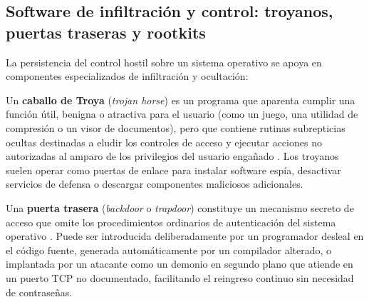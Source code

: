 \documentclass[12pt]{article}
\begin{document}
\subsection{Software de infiltración y control: troyanos, puertas traseras y rootkits}\label{subsec:softwareInfiltracionTroyanosRootkits}

La persistencia del control hostil sobre un sistema operativo se apoya en componentes especializados de infiltración y ocultación:

Un \textbf{caballo de Troya} (\textit{trojan horse}) es un programa que aparenta cumplir una función útil, benigna o atractiva para el usuario (como un juego, una utilidad de compresión o un visor de documentos), pero que contiene rutinas subrepticias ocultas destinadas a eludir los controles de acceso y ejecutar acciones no autorizadas al amparo de los privilegios del usuario engañado \parencite[\S 15.2.1, p.\ 513]{silberschatz2006fundamentos}. Los troyanos suelen operar como puertas de enlace para instalar software espía, desactivar servicios de defensa o descargar componentes maliciosos adicionales.

Una \textbf{puerta trasera} (\textit{backdoor} o \textit{trapdoor}) constituye un mecanismo secreto de acceso que omite los procedimientos ordinarios de autenticación del sistema operativo \parencite[\S 15.2.2, p.\ 514]{silberschatz2006fundamentos}. Puede ser introducida deliberadamente por un programador desleal en el código fuente, generada automáticamente por un compilador alterado, o implantada por un atacante como un demonio en segundo plano que atiende en un puerto TCP no documentado, facilitando el reingreso continuo sin necesidad de contraseñas.
\end{document}
